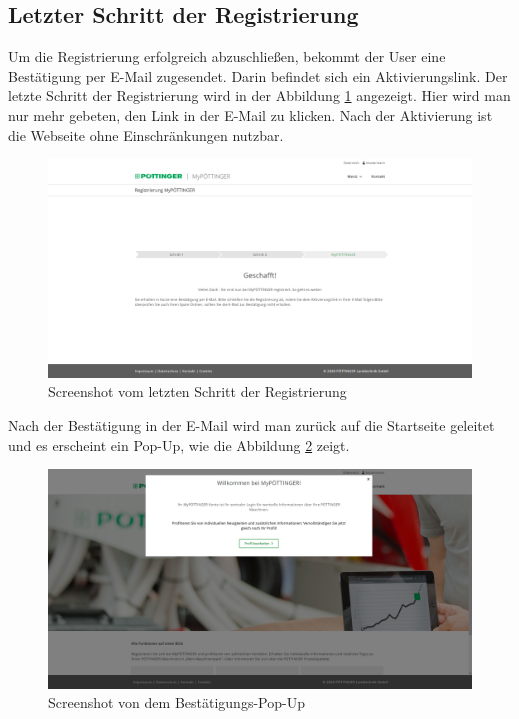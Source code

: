 \subsection{Letzter Schritt der Registrierung}
Um die Registrierung erfolgreich abzuschließen, bekommt der User eine Bestätigung per E-Mail zugesendet. Darin befindet sich ein Aktivierungslink. Der letzte Schritt der Registrierung wird in der Abbildung \ref{fig:step3register} angezeigt. Hier wird man nur mehr gebeten, den Link in der E-Mail zu klicken. Nach der Aktivierung ist die Webseite ohne Einschränkungen nutzbar.
\begin{figure}[H]
	\centerline{
		\includegraphics[width=1\textwidth, frame]{./grafiken/erm_register_final.png}
	}
	\vskip0pt
	\caption{Screenshot vom letzten Schritt der Registrierung} \label{fig:step3register}
\end{figure}
\newpage
Nach der Bestätigung in der E-Mail wird man zurück auf die Startseite geleitet und es erscheint ein Pop-Up, wie die Abbildung \ref{fig:popup} zeigt.

\begin{figure}[H]
	\centerline{
		\includegraphics[width=1\textwidth, frame]{./grafiken/erm_home_after_email.png}
	}
	\vskip0pt
	\caption{Screenshot von dem Bestätigungs-Pop-Up} \label{fig:popup}
\end{figure}

